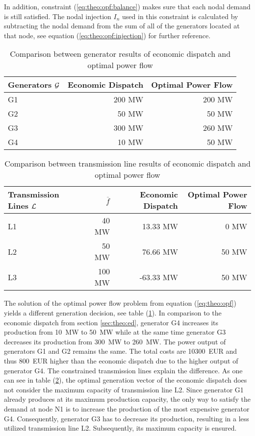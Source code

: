 In addition, constraint (\ref{eq:theo:opf:balance}) makes sure that each nodal demand is still satisfied. The nodal injection $I_n$ used in this constraint is calculated by subtracting the nodal demand from the sum of all of the generators located at that node, see equation (\ref{eq:theo:opf:injection}) for further reference.

\begin{table}[h!]
    \centering
    \begin{tabular}{lrr}
        Generators $\mathcal{G}$ & Economic Dispatch & Optimal Power Flow \\ \toprule
        G1 & 200 MW & 200 MW \\
        G2 & 50 MW & 50 MW \\
        G3 & 300 MW & 260 MW \\
        G4 & 10 MW & 50 MW \\
        \bottomrule
    \end{tabular}
    \caption{Comparison between generator results of economic dispatch and optimal power flow}
    \label{tab:theo:gen-comparison}
\end{table}

\begin{table}[h!]
    \centering
    \begin{tabular}{lrrr}
        Transmission Lines $\mathcal{L}$ & $\overline{f}$ & Economic Dispatch & Optimal Power Flow \\ \toprule
        L1 & 40 MW & 13.33 MW & 0 MW \\
        L2 & 50 MW & 76.66 MW & 50 MW \\
        L3 & 100 MW & -63.33 MW & 50 MW \\
        \bottomrule
    \end{tabular}
    \caption{Comparison between transmission line results of economic dispatch and optimal power flow}
    \label{tab:theo:line-comparison}
\end{table}

The solution of the optimal power flow problem from equation (\ref{eq:theo:opf}) yields a different generation decision, see table (\ref{tab:theo:gen-comparison}). In comparison to the economic dispatch from section \ref{sec:theo:ed}, generator G4 increases its production from \SI{10}{\mega\watt} to \SI{50}{\mega\watt} while at the same time generator G3 decreases its production from \SI{300}{\mega\watt} to \SI{260}{\mega\watt}. The power output of generators G1 and G2 remains the same. The total costs are \SI{10300}{EUR} and thus \SI{800}{EUR} higher than the economic dispatch due to the higher output of generator G4. The constrained transmission lines explain the difference. As one can see in table (\ref{tab:theo:line-comparison}), the optimal generation vector of the economic dispatch does not consider the maximum capacity of transmission line L2. Since generator G1 already produces at its maximum production capacity, the only way to satisfy the demand at node N1 is to increase the production of the most expensive generator G4. Consequently, generator G3 has to decrease its production, resulting in a less utilized transmission line L2. Subsequently, its maximum capacity is ensured. \\

